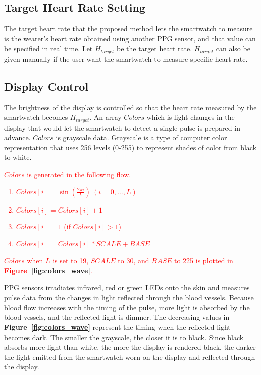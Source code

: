 \documentclass[sigchi,authordraft]{acmart}
\newcommand\figref[1]{\textbf{Figure~\ref{fig:#1}}}
\begin{document}
\subsection{Target Heart Rate Setting}
The target heart rate that the proposed method lets the smartwatch to measure is the wearer's heart rate obtained using another PPG sensor, and that value can be specified in real time. Let $H_{target}$ be the target heart rate. $H_{target}$ can also be given manually if the user want the smartwatch to measure specific heart rate.

\subsection{Display Control}
\label{subsec:display_control}
The brightness of the display is controlled so that the heart rate measured by the smartwatch becomes $H_{target}$. An array $Colors$ which is light changes in the display that would let the smartwatch to detect a single pulse is prepared in advance.
$Colors$ is grayscale data. Grayscale is a type of computer color representation that uses 256 levels (0-255) to represent shades of color from black to white. \textcolor{red}{$Colors$ is generated in the following flow.
\begin{enumerate}
  \renewcommand{\labelenumi}{\arabic{enumi}.}
  \item $Colors[i]=\sin\left(\frac{2\pi i}{L}\right)~(i=0,\dots,L)$
  \item $Colors[i]=Colors[i]+1$
  \item $Colors[i]=1$ (if $Colors[i]>1$)
  \item $Colors[i]=Colors[i]*SCALE+BASE$
\end{enumerate}
$Colors$ when $L$ is set to 19, $SCALE$ to 30, and $BASE$ to 225 is plotted in \figref{colors_wave}.}\par

PPG sensors irradiates infrared, red or green LEDs onto the skin and measures pulse data from the changes in light reflected through the blood vessels. Because blood flow increases with the timing of the pulse, more light is absorbed by the blood vessels, and the reflected light is dimmer. The decreasing values in \figref{colors_wave} represent the timing when the reflected light becomes dark. The smaller the grayscale, the closer it is to black. Since black absorbs more light than white, the more the display is rendered black, the darker the light emitted from the smartwatch worn on the display and reflected through the display.\par
\end{document}
